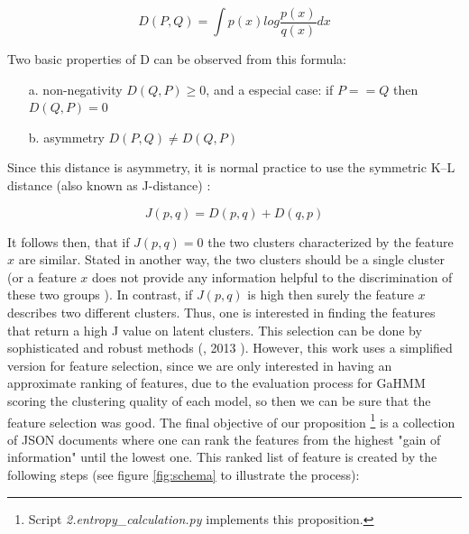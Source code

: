 \begin{equation}
D(P,Q) = \int p(x) log 	\dfrac{p(x)}{q(x)} dx
\end{equation}

Two basic properties of D can be observed from this formula: 
\begin{itemize}
\item[a.] non-negativity $D(Q,P) \geq 0$, and a especial case: if $P == Q$ then $D(Q,P)=0$
\item[b.] asymmetry $D(P,Q) \neq D(Q,P)$
\end{itemize}
Since this distance is asymmetry, it is normal practice to use the symmetric K–L distance (also known as J-distance) \cite{coetzee2005correcting}: 

\begin{equation}
J(p,q) = D(p,q) + D(q,p)
\label{J_distance}
\end{equation}

It follows then, that if $J(p,q) = 0$ the two clusters characterized by the feature $x$ are similar. Stated in another way, the two clusters should be a single cluster (or a feature $x$ does not provide
any information helpful to the discrimination of these two groups
). In contrast, if $J(p,q)$ is high then surely the feature $x$ describes two different clusters. Thus, one is interested in finding the features that return a high J value on latent clusters. This selection can be done by sophisticated and robust methods (\citeauthor{sui2013information}, 2013 \cite{sui2013information}). However, this work uses a simplified version for feature
selection, since we are only interested in having an approximate ranking of features, due to the evaluation process for GaHMM scoring the clustering quality of each model, so then we can be sure that the feature selection was good. The final objective of our proposition \footnote{Script \textit{2.entropy\_calculation.py} implements this proposition.} is a collection of JSON documents where one can rank the
features from the highest "gain of information" until the lowest one. This ranked list of feature is created by the following steps (see figure \ref{fig:schema} to illustrate the process):   

